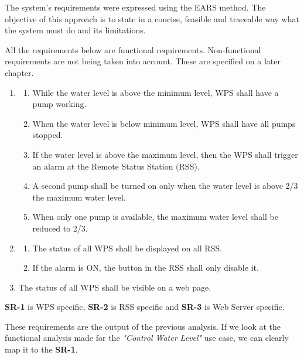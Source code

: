\documentclass[11pt]{article}
\begin{document}
The system's requirements were expressed using the EARS method. The objective of this approach is to state in a concise, feasible and traceable way what the system must do and its limitations.

All the requirements below are functional requirements. Non-functional requirements are not being taken into account. These are specified on a later chapter.

\begin{enumerate}[leftmargin=4em, font=\small, label=\textbf{SR-\arabic*}]
	\setlength\itemsep{.5em}
	\item 
		\begin{enumerate}[leftmargin=1.5em, font=\small, label=\textbf{.\arabic*:}]
		\setlength\itemsep{0em}
		\item While the water level is above the minimum level, WPS shall have a pump working.
		\item When the water level is below minimum level, WPS shall have all pumps stopped.
		\item If the water level is above the maximum level, then the WPS shall trigger an alarm at the Remote Status Station (RSS).
		\item A second pump shall be turned on only when the water level is above 2/3 the maximum water level.
		\item When only one pump is available, the maximum water level shall be reduced to 2/3.
		\end{enumerate}
	\item
		\begin{enumerate}[leftmargin=1.5em, font=\small, label=\textbf{.\arabic*:}]
		\setlength\itemsep{0em}
		\item The status of all WPS shall be displayed on all RSS.
		\item If the alarm is ON, the button in the RSS shall only disable it.
		\end{enumerate}
	\item The status of all WPS shall be visible on a web page.

\end{enumerate}

\noindent
\textbf{SR-1} is WPS specific, \textbf{SR-2} is RSS specific and \textbf{SR-3} is Web Server specific.

These requirements are the output of the previous analysis. If we look at the functional analysis made for the \textit{"Control Water Level"} use case, we can clearly map it to the \textbf{SR-1}. 
\end{document}
